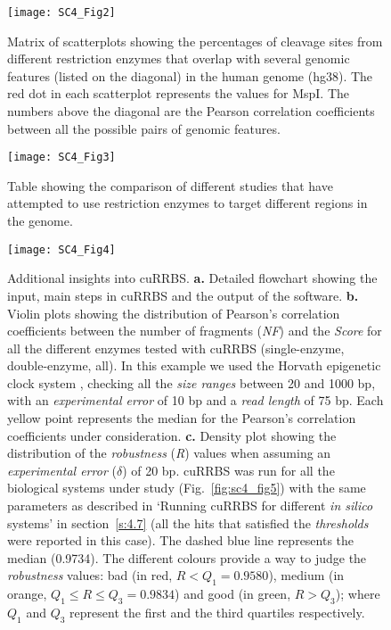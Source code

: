 \begin{figure}[htbp!] 
	\centering    
	\texttt{[image: SC4\_Fig2]}
	\caption[Genomic features that overlap with restriction enzyme cleavage sites]{Matrix of scatterplots showing the percentages of cleavage sites from different restriction enzymes that overlap with several genomic features (listed on the diagonal) in the human genome (hg38). The red dot in each scatterplot represents the values for MspI. The numbers above the diagonal are the Pearson correlation coefficients between all the possible pairs of genomic features.}
	\label{fig:sc4_fig2}
\end{figure}

\begin{figure}[htbp!] 
	\centering    
	\texttt{[image: SC4\_Fig3]}
	\caption[Comparison of studies using restriction enzymes for genomic enrichment]{Table showing the comparison of different studies that have attempted to use restriction enzymes to target different regions in the genome.}
	\label{fig:sc4_fig3}
\end{figure}

\begin{figure}[htbp!] 
	\centering    
	\texttt{[image: SC4\_Fig4]}
	\vspace*{1mm}
	\caption[Additional insights into cuRRBS]{Additional insights into cuRRBS. \textbf{a.} Detailed flowchart showing the input, main steps in cuRRBS and the output of the software. \textbf{b.} Violin plots showing the distribution of Pearson's correlation coefficients between the number of fragments (\textit{NF}) and the \textit{Score} for all the different enzymes tested with cuRRBS (single-enzyme, double-enzyme, all). In this example we used the Horvath epigenetic clock system \citep{Horvath2013}, checking all the \textit{size ranges} between 20 and 1000 bp, with an \textit{experimental error} of 10 bp and a \textit{read length} of 75 bp. Each yellow point represents the median for the Pearson's correlation coefficients under consideration. \textbf{c.} Density plot showing the distribution of the \textit{robustness} (\textit{R}) values when assuming an \textit{experimental error} ($\delta$) of 20 bp. cuRRBS was run for all the biological systems under study (Fig.~\ref{fig:sc4_fig5}) \citep{Horvath2013,Hanna2016,Milagre2017,Kawakatsu2016,Maurano2015,LevMaor2015,Domcke2015} with the same parameters as described in `Running cuRRBS for different \textit{in silico} systems' in section~\ref{s:4.7} (all the hits that satisfied the \textit{thresholds} were reported in this case). The dashed blue line represents the median (0.9734). The different colours provide a way to judge the \textit{robustness} values: bad (in red, $R < Q_1 = 0.9580$), medium (in orange, $Q_1 \leq R \leq Q_3 = 0.9834$) and good (in green, $R > Q_3$); where $Q_1$ and $Q_3$ represent the first and the third quartiles respectively.}
	\label{fig:sc4_fig4}
\end{figure}


